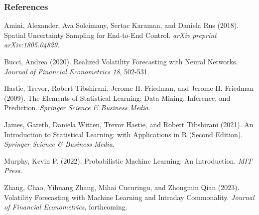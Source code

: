 \documentclass[handout]{beamer}
\begin{document}
\begin{frame}[allowframebreaks]
\frametitle{References}
\footnotesize{
\begin{thebibliography}{99} %

 Amini, Alexander, Ava Soleimany, Sertac Karaman, and Daniela Rus (2018).
\newblock  Spatial Uncertainty Sampling for End-to-End Control.
\newblock \emph{arXiv preprint arXiv:1805.04829}.


 Bucci, Andrea (2020).
\newblock Realized Volatility Forecasting with Neural Networks.
\newblock \emph{Journal of Financial Econometrics 18}, 502-531.


 Hastie, Trevor, Robert Tibshirani, Jerome H. Friedman, and Jerome H. Friedman (2009).
\newblock  The Elements of Statistical Learning: Data Mining, Inference, and Prediction.
\newblock \emph{Springer Science \& Business Media}.


 James, Gareth, Daniela Witten, Trevor  Hastie, and Robert Tibshirani (2021).
\newblock  An Introduction to Statistical Learning: with Applications in R (Second Edition).
\newblock \emph{Springer Science \& Business Media}.


 Murphy, Kevin P. (2022).
\newblock  Probabilistic Machine Learning: An Introduction.
\newblock \emph{MIT Press}.


 Zhang,  Chao, Yihuang Zhang, Mihai Cucuringu, and Zhongmin Qian (2023).
\newblock Volatility Forecasting with Machine Learning and Intraday Commonality.
\newblock \emph{Journal of Financial Econometrics}, forthcoming.

\end{thebibliography}
}
\end{frame}


\end{document}
